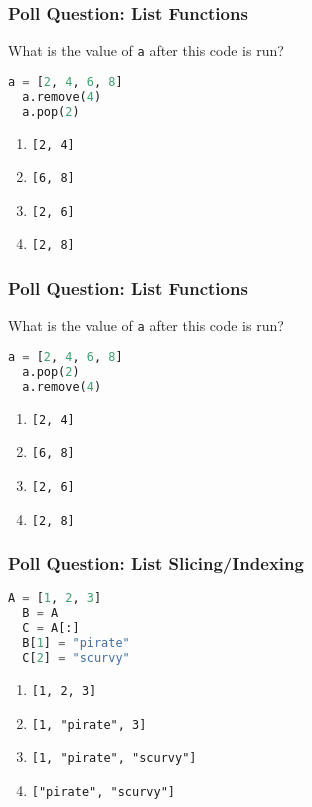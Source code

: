 \documentclass{beamer}
\begin{document}
%
%
\begin{frame}[fragile]
  \frametitle{Poll Question: List Functions}
  What is the value of \lstinline|a| after this code is run?
  \begin{lstlisting}[language=Python, autogobble]
  a = [2, 4, 6, 8]
  a.remove(4)
  a.pop(2)
  \end{lstlisting}
  \vfill
  \begin{enumerate}[A]
    \item \lstinline|[2, 4]|
    \item \lstinline|[6, 8]|
    \item \lstinline|[2, 6]|
    \item \lstinline|[2, 8]|
  \end{enumerate}
\end{frame}

%
%
\begin{frame}[fragile]
  \frametitle{Poll Question: List Functions}
  What is the value of \lstinline|a| after this code is run?
  \begin{lstlisting}[language=Python, autogobble]
  a = [2, 4, 6, 8]
  a.pop(2)
  a.remove(4)
  \end{lstlisting}
  \vfill
  \begin{enumerate}[A]
    \item \lstinline|[2, 4]|
    \item \lstinline|[6, 8]|
    \item \lstinline|[2, 6]|
    \item \lstinline|[2, 8]|
  \end{enumerate}
\end{frame}

%
%
\begin{frame}[fragile]
  \frametitle{Poll Question: List Slicing/Indexing}
  \begin{lstlisting}[language=Python, autogobble]
  A = [1, 2, 3]
  B = A
  C = A[:]
  B[1] = "pirate"
  C[2] = "scurvy"
  \end{lstlisting}
  \vfill
  \begin{enumerate}[A]
    \item \lstinline|[1, 2, 3]|
    \item \lstinline|[1, "pirate", 3]|
    \item \lstinline|[1, "pirate", "scurvy"]|
    \item \lstinline|["pirate", "scurvy"]|
  \end{enumerate}
\end{frame}
\end{document}
